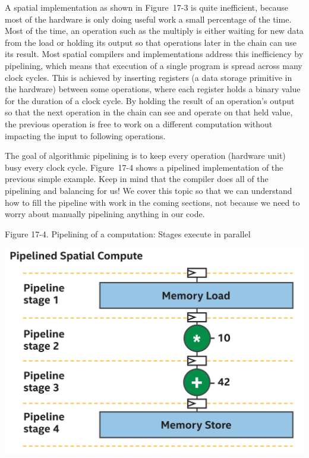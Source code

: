 A spatial implementation as shown in Figure 17-3 is quite inefficient, because most of the hardware is only doing useful work a small percentage of the time. Most of the time, an operation such as the multiply is either waiting for new data from the load or holding its output so that operations later in the chain can use its result. Most spatial compilers and implementations address this inefficiency by pipelining, which means that execution of a single program is spread across many clock cycles. This is achieved by inserting registers (a data storage primitive in the hardware) between some operations, where each register holds a binary value for the duration of a clock cycle. By holding the result of an operation’s output so that the next operation in the chain can see and operate on that held value, the previous operation is free to work on a different computation without impacting the input to following operations.\par

The goal of algorithmic pipelining is to keep every operation (hardware unit) busy every clock cycle. Figure 17-4 shows a pipelined implementation of the previous simple example. Keep in mind that the compiler does all of the pipelining and balancing for us! We cover this topic so that we can understand how to fill the pipeline with work in the coming sections, not because we need to worry about manually pipelining anything in our code.\par

\hspace*{\fill} \par %
Figure 17-4. Pipelining of a computation: Stages execute in parallel
\begin{center}
	\includegraphics[width=1.0\textwidth]{content/chapter-17/images/5}
\end{center}

